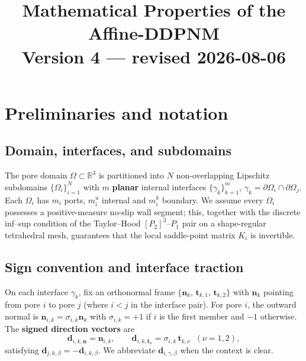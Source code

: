 \documentclass[11pt,a4paper]{article}
\newcommand{\R}{\mathbb{R}}
\newcommand{\dom}{\Omega}
\newcommand{\pore}[1]{\Omega_{#1}}
\newcommand{\iface}{\gamma}
\newcommand{\normal}{\bm{n}}
\begin{document}
\title{\textbf{Mathematical Properties of the Affine-DDPNM}\\[4pt]
       \large Version 4 --- revised 2026-08-06}
\author{}
\date{}
\maketitle

\section{Preliminaries and notation}

\subsection{Domain, interfaces, and subdomains}

The pore domain $\dom \subset \R^3$ is partitioned into $N$ non-overlapping
Lipschitz subdomains $\{\pore{i}\}_{i=1}^N$ with $m$ \textbf{planar} internal
interfaces $\{\iface_k\}_{k=1}^m$,
$\iface_k = \partial\pore{i} \cap \partial\pore{j}$.
Each $\pore{i}$ has $m_i$ ports, $m_i^u$ internal and $m_i^k$ boundary.
We assume every $\pore{i}$ possesses a positive-measure no-slip wall segment;
this, together with the discrete inf--sup condition of the Taylor--Hood
$[P_2]^3$--$P_1$ pair on a shape-regular tetrahedral mesh, guarantees that
the local saddle-point matrix $K_i$ is invertible.

\subsection{Sign convention and interface traction}

On each interface $\iface_k$, fix an orthonormal frame
$\{\normal_k,\,\bm{t}_{k,1},\,\bm{t}_{k,2}\}$
with $\normal_k$ pointing from pore $i$ to pore $j$ (where $i<j$ in the
interface pair).  For pore $i$, the outward normal is
$\normal_{i,k} = \sigma_{i,k}\normal_k$ with
$\sigma_{i,k}=+1$ if $i$ is the first member and $-1$ otherwise.
The \textbf{signed direction vectors} are
\begin{equation}\label{eq:dir}
  \bm{d}_{i,k,\normal} = \normal_{i,k},\qquad
  \bm{d}_{i,k,\bm{t}_\nu} = \sigma_{i,k}\,\bm{t}_{k,\nu}\;\;(\nu=1,2),
\end{equation}
satisfying $\bm{d}_{j,k,\beta} = -\bm{d}_{i,k,\beta}$.
We abbreviate $\bm{d}_{i,\gamma,\beta}$ when the context is clear.
\end{document}
